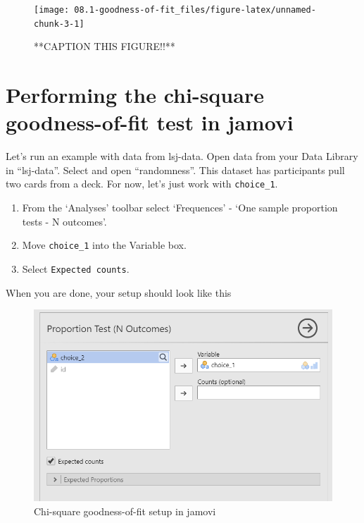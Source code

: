 \documentclass[
]{book}
\begin{document}
\begin{figure}

{\centering \texttt{[image: 08.1-goodness-of-fit\_files/figure-latex/unnamed-chunk-3-1]} 

}

\caption{**CAPTION THIS FIGURE!!**}\label{fig:unnamed-chunk-3}
\end{figure}

\hypertarget{performing-the-chi-square-goodness-of-fit-test-in-jamovi}{%
\section{Performing the chi-square goodness-of-fit test in jamovi}\label{performing-the-chi-square-goodness-of-fit-test-in-jamovi}}

Let's run an example with data from lsj-data. Open data from your Data Library in ``lsj-data''. Select and open ``randomness''. This dataset has participants pull two cards from a deck. For now, let's just work with \texttt{choice\_1}.

\begin{enumerate}
\def\labelenumi{\arabic{enumi}.}
\item
  From the `Analyses' toolbar select `Frequences' - `One sample proportion tests - N outcomes'.
\item
  Move \texttt{choice\_1} into the Variable box.
\item
  Select \texttt{Expected\ counts}.
\end{enumerate}

When you are done, your setup should look like this

\begin{figure}

{\centering \includegraphics[width=0.8\linewidth]{images/09-chi-square/chi-square_setup} 

}

\caption{Chi-square goodness-of-fit setup in jamovi}\label{fig:unnamed-chunk-4}
\end{figure}
\end{document}
